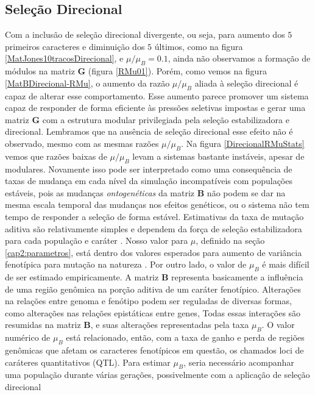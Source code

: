 \subsection{Seleção Direcional}
\label{cap3:DirecB}

Com a inclusão de seleção direcional divergente, ou seja, para aumento
dos $5$ primeiros caracteres e diminuição dos $5$ últimos, como na
figura \ref{MatJones10tracosDirecional}, e $\mu/\mu_B = 0.1$, ainda não
observamos a formação de módulos na matriz $\mathbf{G}$ (figura
\ref{RMu01}). 
Porém, como vemos na figura \ref{MatBDirecional-RMu}, o aumento  da
razão $\mu/\mu_B$ aliada à seleção direcional é capaz de alterar esse
comportamento. 
Esse aumento parece promover um sistema capaz de responder de forma
eficiente às pressões seletivas impostas e gerar uma matriz $\mathbf{G}$ com a
estrutura modular privilegiada pela seleção estabilizadora e direcional. 
Lembramos que na ausência de seleção direcional esse efeito não é
observado, mesmo com as mesmas razões $\mu/\mu_B$. 
Na figura \ref{DirecionalRMuStats} vemos que razões baixas de $\mu/\mu_B$ levam
a sistemas bastante instáveis, apesar de modulares. 
Novamente isso pode ser interpretado como uma consequência de taxas de
mudança em cada nível da simulação incompatíveis com populações
estáveis, pois as mudanças {\it ontogenéticas} da matriz $\mathbf{B}$ não podem se dar na mesma
escala temporal das mudanças nos efeitos genéticos, ou o sistema não tem tempo de
responder a seleção de forma estável. 
Estimativas da taxa de mutação aditiva são relativamente
simples e dependem da força de seleção estabilizadora para cada
população e caráter \citep{Lynch1998}.
Nosso valor para $\mu$, definido na seção \ref{cap2:parametros}, está
dentro dos valores esperados para aumento de variância fenotípica para
mutação na natureza \citep{Burger1994}.
Por outro lado, o valor de $\mu_B$ é mais difícil de ser estimado empiricamente.
A matriz $\mathbf{B}$ representa basicamente a influência de uma região
genômica na porção aditiva de um caráter fenotípico.
Alterações na relações entre genoma e fenótipo podem ser reguladas de
diversas formas, como alterações nas relações epistáticas entre genes,
Todas essas interações são resumidas na matriz $\mathbf{B}$, e suas
alterações representadas pela taxa $\mu_B$.
O valor numérico de $\mu_B$ está relacionado, então, com a taxa de ganho
e perda de regiões genômicas que afetam os caracteres fenotípicos em
questão, os chamados loci de caráteres quantitativos (QTL).
Para estimar $\mu_B$, seria necessário acompanhar uma população durante
várias gerações, possivelmente com a aplicação de seleção direcional
